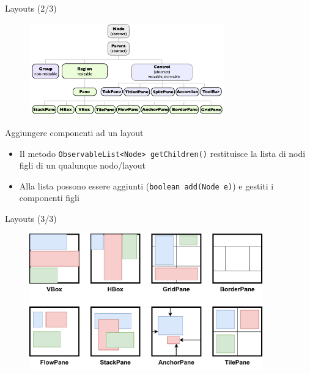 \documentclass[xcolor=dvipsnames,presentation]{beamer}
\begin{document}
\begin{frame}{Layouts (2/3)}
\begin{figure}
\includegraphics[width=0.75\textwidth]{img/layouts.png}
\end{figure}

\begin{block}{Aggiungere componenti ad un layout}
\begin{itemize}
\item Il metodo \texttt{ObservableList<Node> getChildren()} restituisce la lista di nodi figli di un qualunque nodo/layout
\item Alla lista possono essere aggiunti (\texttt{boolean add(Node e)}) e gestiti i componenti figli
\end{itemize}
\end{block}
\end{frame}

\begin{frame}{Layouts (3/3)}

\begin{figure}
\centering
\includegraphics[width=0.9\textwidth]{img/javafx-layouts.drawio.pdf}
\end{figure}

\end{frame}
\end{document}
